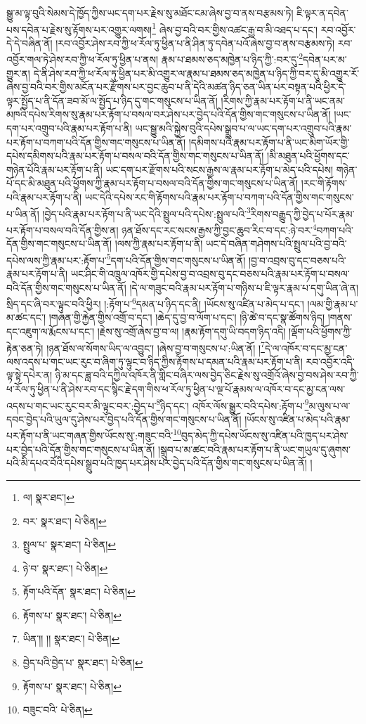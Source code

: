སྒྱུ་མ་ལྟ་བུའི་སེམས་དེ་ཁྱོད་ཀྱིས་ཡང་དག་པར་རྗེས་སུ་མཐོང་ངམ་ཞེས་བྱ་བ་ནས་བརྩམས་ཏེ། ཇི་ལྟར་ན་དབེན་པས་དབེན་པ་རྗེས་སུ་རྟོགས་པར་འགྱུར་ལགས།\footnote{ལ།  སྣར་ཐང་། } ཞེས་བྱ་བའི་བར་གྱིས་འཚང་རྒྱ་བ་མི་འཐད་པ་དང་། རབ་འབྱོར་དེ་དེ་བཞིན་ནོ། །རབ་འབྱོར་ཤེས་རབ་ཀྱི་ཕ་རོལ་ཏུ་ཕྱིན་པ་ནི་ཤིན་ཏུ་དབེན་པའོ་ཞེས་བྱ་བ་ནས་བརྩམས་ཏེ། རབ་འབྱོར་གལ་ཏེ་ཤེས་རབ་ཀྱི་ཕ་རོལ་ཏུ་ཕྱིན་པ་ནས། རྣམ་པ་ཐམས་ཅད་མཁྱེན་པ་ཉིད་ཀྱི་:བར་དུ་\footnote{བར་  སྣར་ཐང་།  པེ་ཅིན། }དབེན་པར་མ་གྱུར་ན། དེ་ནི་ཤེས་རབ་ཀྱི་ཕ་རོལ་ཏུ་ཕྱིན་པར་མི་འགྱུར་ལ་རྣམ་པ་ཐམས་ཅད་མཁྱེན་པ་ཉིད་ཀྱི་བར་དུ་མི་འགྱུར་རོ་ཞེས་བྱ་བའི་བར་གྱིས་མངོན་པར་རྫོགས་པར་བྱང་ཆུབ་པ་ནི་དེའི་མཚན་ཉིད་ཅན་ཡིན་པར་བསྟན་པའི་ཕྱིར་དེ་ལྟར་སྤྱོད་པ་ནི་དོན་ཟབ་མོ་ལ་སྤྱོད་པ་ཉིད་དུ་གང་གསུངས་པ་ཡིན་ནོ། །རིགས་ཀྱི་རྣམ་པར་རྟོག་པ་ནི་ཡང་ནམ་མཁའི་དཔེས་རིགས་སུ་རྣམ་པར་རྟོག་པ་བསལ་བར་ཤེས་པར་བྱེད་པའི་དོན་གྱིས་གང་གསུངས་པ་ཡིན་ནོ། །ཡང་དག་པར་འགྲུབ་པའི་རྣམ་པར་རྟོག་པ་ནི། ཡང་སྒྱུ་མའི་སྐྱེས་བུའི་དཔེས་སྒྲུབ་པ་ལ་ཡང་དག་པར་འགྲུབ་པའི་རྣམ་པར་རྟོག་པ་བཀག་པའི་དོན་གྱིས་གང་གསུངས་པ་ཡིན་ནོ། །དམིགས་པའི་རྣམ་པར་རྟོག་པ་ནི་ཡང་མིག་ཡོར་གྱི་དཔེས་དམིགས་པའི་རྣམ་པར་རྟོག་པ་བསལ་བའི་དོན་གྱིས་གང་གསུངས་པ་ཡིན་ནོ། །མི་མཐུན་པའི་ཕྱོགས་དང་གཉེན་པོའི་རྣམ་པར་རྟོག་པ་ནི། ཡང་དག་པར་རྫོགས་པའི་སངས་རྒྱས་ལ་རྣམ་པར་རྟོག་པ་མེད་པའི་དཔེས། གཉེན་པོ་དང་མི་མཐུན་པའི་ཕྱོགས་ཀྱི་རྣམ་པར་རྟོག་པ་བསལ་བའི་དོན་གྱིས་གང་གསུངས་པ་ཡིན་ནོ། །རང་གི་རྟོགས་པའི་རྣམ་པར་རྟོག་པ་ནི། ཡང་དེའི་དཔེས་རང་གི་རྟོགས་པའི་རྣམ་པར་རྟོག་པ་བཀག་པའི་དོན་གྱིས་གང་གསུངས་པ་ཡིན་ནོ། །བྱེད་པའི་རྣམ་པར་རྟོག་པ་ནི་ཡང་དེའི་སྤྲུལ་པའི་དཔེས་:སྤྲུལ་པའི་\footnote{སྤྲུལ་པ་  སྣར་ཐང་།  པེ་ཅིན། }རིགས་བརྒྱུད་ཀྱི་བྱེད་པ་པོར་རྣམ་པར་རྟོག་པ་བསལ་བའི་དོན་གྱིས་ན། ཉན་ཐོས་དང་རང་སངས་རྒྱས་ཀྱི་བྱང་ཆུབ་རིང་བ་དང་:ཉེ་བར་\footnote{ཉེ་བ་  སྣར་ཐང་།  པེ་ཅིན། }བཀག་པའི་དོན་གྱིས་གང་གསུངས་པ་ཡིན་ནོ། །ལས་ཀྱི་རྣམ་པར་རྟོག་པ་ནི། ཡང་དེ་བཞིན་གཤེགས་པའི་སྤྲུལ་པའི་བྱ་བའི་དཔེས་ལས་ཀྱི་རྣམ་པར་:རྟོག་པ་\footnote{རྟོག་པའི་དོན་  སྣར་ཐང་།  པེ་ཅིན། }དག་པའི་དོན་གྱིས་གང་གསུངས་པ་ཡིན་ནོ། །བྱ་བ་འབྲས་བུ་དང་བཅས་པའི་རྣམ་པར་རྟོག་པ་ནི། ཡང་ཤིང་གི་འཁྲུལ་འཁོར་གྱི་དཔེས་བྱ་བ་འབྲས་བུ་དང་བཅས་པའི་རྣམ་པར་རྟོག་པ་བསལ་བའི་དོན་གྱིས་གང་གསུངས་པ་ཡིན་ནོ། །དེ་ལ་གཟུང་བའི་རྣམ་པར་རྟོག་པ་གཉིས་པ་ཇི་ལྟར་རྣམ་པ་དགུ་ཡིན་ཞེ་ན། སྲིད་དང་ཞི་བར་ལྟུང་བའི་ཕྱིར། །:རྟོག་པ་\footnote{རྟོགས་པ་  སྣར་ཐང་།  པེ་ཅིན། }དམན་པ་ཉིད་དང་ནི། །ཡོངས་སུ་འཛིན་པ་མེད་པ་དང་། །ལམ་གྱི་རྣམ་པ་མ་ཚང་དང་། །གཞན་གྱི་རྐྱེན་གྱིས་འགྲོ་བ་དང་། །ཆེད་དུ་བྱ་བ་ལོག་པ་དང་། །ཉི་ཚེ་བ་དང་སྣ་ཚོགས་ཉིད། །གནས་དང་འཇུག་ལ་རྨོངས་པ་དང་། །རྗེས་སུ་འགྲོ་ཞེས་བྱ་བ་ལ། །རྣམ་རྟོག་དགུ་ཡི་བདག་ཉིད་འདི། །ལྡོག་པའི་ཕྱོགས་ཀྱི་རྟེན་ཅན་ཏེ། །ཉན་ཐོས་ལ་སོགས་ཡིད་ལ་འབྱུང་། །ཞེས་བྱ་བ་གསུངས་པ་:ཡིན་ནོ། །\footnote{ཡིན་།། །།  སྣར་ཐང་།  པེ་ཅིན། }དེ་ལ་འཁོར་བ་དང་མྱ་ངན་ལས་འདས་པ་གང་ཡང་རུང་བ་ཞིག་ཏུ་ལྟུང་བ་ཉིད་ཀྱིས་རྟོགས་པ་དམན་པའི་རྣམ་པར་རྟོག་པ་ནི། རབ་འབྱོར་འདི་ལྟ་སྟེ་དཔེར་ན། ཉི་མ་དང་ཟླ་བའི་དཀྱིལ་འཁོར་ནི་གླིང་བཞིར་ལས་བྱེད་ཅིང་རྗེས་སུ་འགྲོའོ་ཞེས་བྱ་བས་ཤེས་རབ་ཀྱི་ཕ་རོལ་ཏུ་ཕྱིན་པ་ནི་ཤེས་རབ་དང་སྙིང་རྗེ་དག་གིས་ཕ་རོལ་ཏུ་ཕྱིན་པ་ལྔ་པོ་རྣམས་ལ་འཁོར་བ་དང་མྱ་ངན་ལས་འདས་པ་གང་ཡང་རུང་བར་མི་ལྟུང་བར་:བྱེད་པ་\footnote{བྱེད་པའི་བྱེད་པ་  སྣར་ཐང་།  པེ་ཅིན། }ཉིད་དང་། འཁོར་ལོས་སྒྱུར་བའི་དཔེས་:རྟོག་པ་\footnote{རྟོགས་པ་  སྣར་ཐང་།  པེ་ཅིན། }མ་ལུས་པ་ལ་དབང་བྱེད་པའི་ཡུལ་དུ་ཤེས་པར་བྱེད་པའི་དོན་གྱིས་གང་གསུངས་པ་ཡིན་ནོ། །ཡོངས་སུ་འཛིན་པ་མེད་པའི་རྣམ་པར་རྟོག་པ་ནི་ཡང་གཞན་གྱིས་ཡོངས་སུ་:གཟུང་བའི་\footnote{བཟུང་བའི་  པེ་ཅིན། }བུད་མེད་ཀྱི་དཔེས་ཡོངས་སུ་འཛིན་པའི་ཁྱད་པར་ཤེས་པར་བྱེད་པའི་དོན་གྱིས་གང་གསུངས་པ་ཡིན་ནོ། །སྒྲུབ་པ་མ་ཚང་བའི་རྣམ་པར་རྟོག་པ་ནི་ཡང་གཡུལ་དུ་ཞུགས་པའི་མི་དཔའ་བོའི་དཔེས་སྒྲུབ་པའི་ཁྱད་པར་ཤེས་པར་བྱེད་པའི་དོན་གྱིས་གང་གསུངས་པ་ཡིན་ནོ། །
